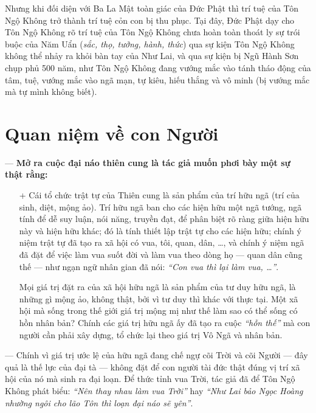 Nhưng khi đối diện với Ba La Mật toàn giác của Đức Phật thì trí tuệ của Tôn Ngộ Không trở thành trí tuệ cỏn con bị thu phục. Tại đây, Đức Phật dạy cho Tôn Ngộ Không rõ trí tuệ của Tôn Ngộ Không chưa hoàn toàn thoát ly sự trói buộc của Năm Uẩn (\emph{sắc, thọ, tưởng, hành, thức}) qua sự kiện Tôn Ngộ Không không thể nhảy ra khỏi bàn tay của Như Lai, và qua sự kiện bị Ngũ Hành Sơn chụp phủ 500 năm, như Tôn Ngộ Không đang vướng mắc vào tánh tháo động của tâm, tuệ, vướng mắc vào ngã mạn, tự kiêu, hiếu thắng và vô minh (bị vướng mắc mà tự mình không biết).


\section{Quan niệm về con Người} %
\label{sec:4_con_nguoi}

— {\bf Mở ra cuộc đại náo thiên cung là tác giả muốn phơi bày một sự thật rằng:}

\begin{enumerate}[label=\itshape\alph*\upshape/]

    \item[+] Cái tổ chức trật tự của Thiên cung là sản phẩm của trí hữu ngã (trí của sinh, diệt, mộng ảo). Trí hữu ngã ban cho các hiện hữu một ngã tướng, ngã tính để dễ suy luận, nói năng, truyền đạt, để phân biệt rõ ràng giữa hiện hữu này và hiện hữu khác; đó là tính thiết lập trật tự cho các hiện hữu; chính ý niệm trật tự đã tạo ra xã hội có vua, tôi, quan, dân, \ldots, và chính ý niệm ngã đã đặt để việc làm vua suốt đời và làm vua theo dòng họ — quan dân cũng thế — như ngạn ngữ nhân gian đã nói: \emph{``Con vua thì lại làm vua, \ldots''}.

    Mọi giá trị đặt ra của xã hội hữu ngã là sản phẩm của tư duy hữu ngã, là những gì mộng ảo, không thật, bởi vì tư duy thì khác với thực tại. Một xã hội mà sống trong thế giới giá trị mộng mị như thế làm sao có thể sống có hồn nhân bản? Chính các giá trị hữu ngã ấy đã tạo ra cuộc \emph{``hỗn thế''} mà con người cần phải xây dựng, tổ chức lại theo giá trị Vô Ngã và nhân bản.
\end{enumerate}

— Chính vì giá trị ước lệ của hữu ngã đang chế ngự cõi Trời và cõi Người — đây quả là thế lực của đại tà — không đặt để con người tài đức thật đúng vị trí xã hội của nó mà sinh ra đại loạn. Để thức tỉnh vua Trời, tác giả đã để Tôn Ngộ Không phát biểu: \emph{``Nên thay nhau làm vua Trời''} hay \emph{``Như Lai bảo Ngọc Hoàng nhường ngôi cho lão Tôn thì loạn đại náo sẽ yên''}.

